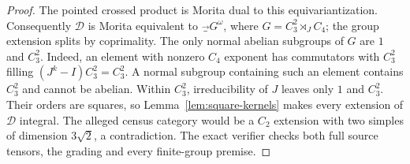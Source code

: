 \begin{proof}
The pointed crossed product is Morita dual to this equivariantization.
Consequently $\mathcal D$ is Morita equivalent to $\Vec_G^\omega$,
where $G=C_3^2\rtimes_J C_4$; the group extension splits by coprimality.
The only normal abelian subgroups of $G$ are $1$ and $C_3^2$.
Indeed, an element with nonzero $C_4$ exponent has commutators with
$C_3^2$ filling $(J^k-I)C_3^2=C_3^2$. A normal subgroup containing
such an element contains $C_3^2$ and cannot be abelian. Within
$C_3^2$, irreducibility of $J$ leaves only $1$ and $C_3^2$.
Their orders are squares, so Lemma~\ref{lem:square-kernels} makes
every extension of $\mathcal D$ integral. The alleged census category
would be a $C_2$ extension with two simples of dimension $3\sqrt2$,
a contradiction. The exact verifier checks both full source tensors,
the grading and every finite-group premise.
\end{proof}

